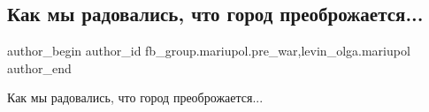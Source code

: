  
 
 
 
 

\subsection{Как мы радовались, что город преоброжается...}
\label{sec:14_02_2023.fb.fb_group.mariupol.pre_war.3.kak_mi_radovalis__ch}
 
\ifcmt
 author_begin
   author_id fb_group.mariupol.pre_war,levin_olga.mariupol
 author_end
\fi

Как мы радовались, что город преоброжается...

